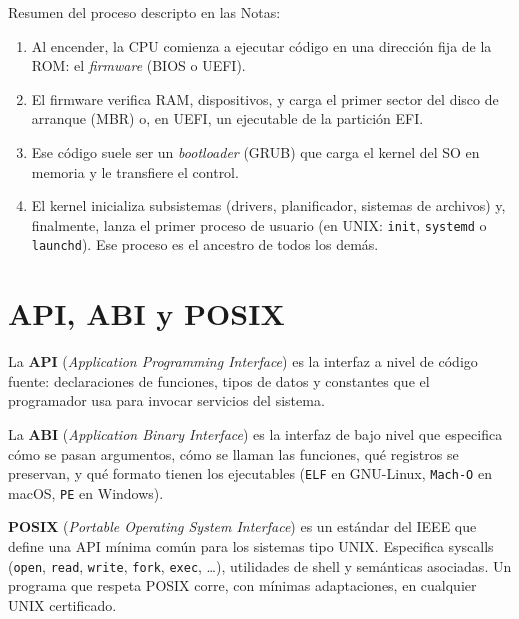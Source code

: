 \documentclass[11pt,a4paper]{article}
\begin{document}
Resumen del proceso descripto en las Notas:

\begin{enumerate}[leftmargin=*]
    \item Al encender, la CPU comienza a ejecutar código en una
        dirección fija de la ROM: el \emph{firmware} (BIOS o UEFI).
    \item El firmware verifica RAM, dispositivos, y carga el primer
        sector del disco de arranque (MBR) o, en UEFI, un ejecutable
        de la partición EFI.
    \item Ese código suele ser un \emph{bootloader} (GRUB) que carga
        el kernel del SO en memoria y le transfiere el control.
    \item El kernel inicializa subsistemas (drivers, planificador,
        sistemas de archivos) y, finalmente, lanza el primer proceso de
        usuario (en UNIX: \texttt{init}, \texttt{systemd} o
        \texttt{launchd}). Ese proceso es el ancestro de todos los
        demás.
\end{enumerate}

\section{API, ABI y POSIX}

\begin{definicion}
La \textbf{API} (\emph{Application Programming Interface}) es la
interfaz a nivel de código fuente: declaraciones de funciones, tipos de
datos y constantes que el programador usa para invocar servicios del
sistema.
\end{definicion}

\begin{definicion}
La \textbf{ABI} (\emph{Application Binary Interface}) es la interfaz de
bajo nivel que especifica cómo se pasan argumentos, cómo se llaman las
funciones, qué registros se preservan, y qué formato tienen los
ejecutables (\texttt{ELF} en GNU-Linux, \texttt{Mach-O} en macOS,
\texttt{PE} en Windows).
\end{definicion}

\begin{definicion}
\textbf{POSIX} (\emph{Portable Operating System Interface}) es un
estándar del IEEE que define una API mínima común para los sistemas
tipo UNIX. Especifica syscalls (\texttt{open}, \texttt{read},
\texttt{write}, \texttt{fork}, \texttt{exec}, \ldots), utilidades de
shell y semánticas asociadas. Un programa que respeta POSIX corre, con
mínimas adaptaciones, en cualquier UNIX certificado.
\end{definicion}
\end{document}
